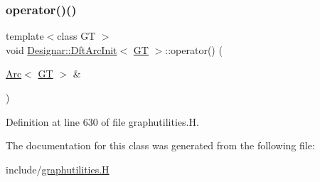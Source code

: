 \subsubsection{\texorpdfstring{operator()()}{operator()()}}
{\footnotesize\ttfamily template$<$class GT $>$ \\
void \hyperlink{class_designar_1_1_dft_arc_init}{Designar\+::\+Dft\+Arc\+Init}$<$ \hyperlink{demo-buildgraph_8_c_a3001c40d2c31ca87ed96cd7d1334a55e}{GT} $>$\+::operator() (\begin{DoxyParamCaption}\item[{\hyperlink{namespace_designar_a3f55fb5513d62ff47cbc8f72b8e95d6f}{Arc}$<$ \hyperlink{demo-buildgraph_8_c_a3001c40d2c31ca87ed96cd7d1334a55e}{GT} $>$ \&}]{ }\end{DoxyParamCaption})\hspace{0.3cm}{\ttfamily [inline]}}



Definition at line 630 of file graphutilities.\+H.



The documentation for this class was generated from the following file\+:\begin{DoxyCompactItemize}
\item 
include/\hyperlink{graphutilities_8_h}{graphutilities.\+H}\end{DoxyCompactItemize}
